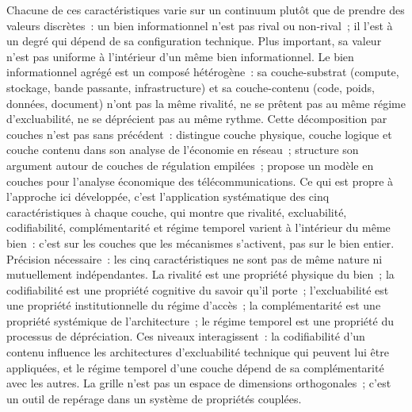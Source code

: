 Chacune de ces caractéristiques varie sur un continuum plutôt que de prendre des valeurs discrètes~: un bien informationnel n'est pas rival ou non-rival~; il l'est à un degré qui dépend de sa configuration technique. Plus important, sa valeur n'est pas uniforme à l'intérieur d'un même bien informationnel. Le bien informationnel agrégé est un composé hétérogène~: sa couche-substrat (compute, stockage, bande passante, infrastructure) et sa couche-contenu (code, poids, données, document) n'ont pas la même rivalité, ne se prêtent pas au même régime d'excluabilité, ne se déprécient pas au même rythme. Cette décomposition par couches n'est pas sans précédent~: \textcite{benkler_wealth_2006} distingue couche physique, couche logique et couche contenu dans son analyse de l'économie en réseau~; \textcite{lessig_code_1999} structure son argument autour de couches de régulation empilées~; \textcite{yoo_vertical_2002} propose un modèle en couches pour l'analyse économique des télécommunications. Ce qui est propre à l'approche ici développée, c'est l'application systématique des cinq caractéristiques à chaque couche, qui montre que rivalité, excluabilité, codifiabilité, complémentarité et régime temporel varient à l'intérieur du même bien~: c'est sur les couches que les mécanismes s'activent, pas sur le bien entier. Précision nécessaire~: les cinq caractéristiques ne sont pas de même nature ni mutuellement indépendantes. La rivalité est une propriété physique du bien~; la codifiabilité est une propriété cognitive du savoir qu'il porte~; l'excluabilité est une propriété institutionnelle du régime d'accès~; la complémentarité est une propriété systémique de l'architecture~; le régime temporel est une propriété du processus de dépréciation. Ces niveaux interagissent~: la codifiabilité d'un contenu influence les architectures d'excluabilité technique qui peuvent lui être appliquées, et le régime temporel d'une couche dépend de sa complémentarité avec les autres. La grille n'est pas un espace de dimensions orthogonales~; c'est un outil de repérage dans un système de propriétés couplées.

